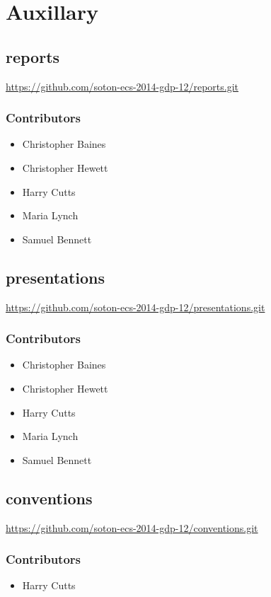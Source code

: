 \section{Auxillary}

\subsection{reports}
\label{Section:Repo_reports}

\url{https://github.com/soton-ecs-2014-gdp-12/reports.git}

\subsubsection{Contributors}
\begin{itemize}
  \item Christopher Baines
  \item Christopher Hewett
  \item Harry Cutts
  \item Maria Lynch
  \item Samuel Bennett
\end{itemize}

\subsection{presentations}
\label{Section:Repo_presentations}

\url{https://github.com/soton-ecs-2014-gdp-12/presentations.git}

\subsubsection{Contributors}
\begin{itemize}
  \item Christopher Baines
  \item Christopher Hewett
  \item Harry Cutts
  \item Maria Lynch
  \item Samuel Bennett
\end{itemize}

\subsection{conventions}
\label{Section:Repo_conventions}

\url{https://github.com/soton-ecs-2014-gdp-12/conventions.git}

\subsubsection{Contributors}
\begin{itemize}
  \item Harry Cutts
\end{itemize}
